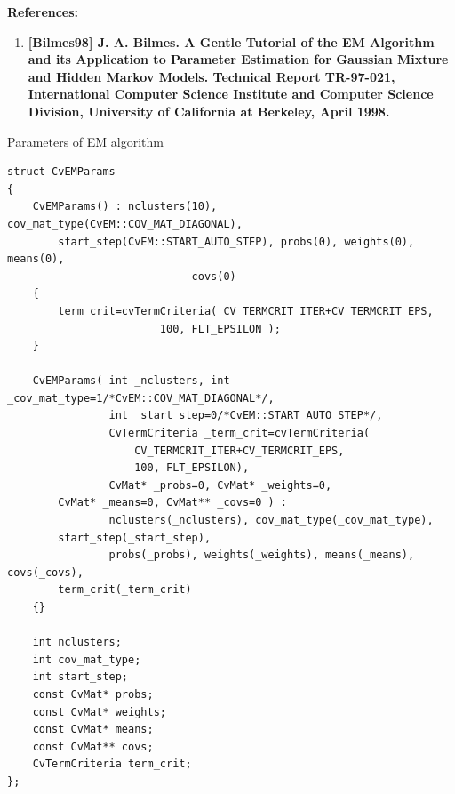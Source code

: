 \textbf{References:}
\begin{enumerate}
\item{\textbf{[Bilmes98] J. A. Bilmes. A Gentle Tutorial of the EM Algorithm and its Application to Parameter Estimation for Gaussian Mixture and Hidden Markov Models. Technical Report TR-97-021, International Computer Science Institute and Computer Science Division, University of California at Berkeley, April 1998.}}
\end{enumerate}



Parameters of EM algorithm

\begin{lstlisting}
struct CvEMParams
{
    CvEMParams() : nclusters(10), cov_mat_type(CvEM::COV_MAT_DIAGONAL),
        start_step(CvEM::START_AUTO_STEP), probs(0), weights(0), means(0), 
						     covs(0)
    {
        term_crit=cvTermCriteria( CV_TERMCRIT_ITER+CV_TERMCRIT_EPS, 
						100, FLT_EPSILON );
    }

    CvEMParams( int _nclusters, int _cov_mat_type=1/*CvEM::COV_MAT_DIAGONAL*/,
                int _start_step=0/*CvEM::START_AUTO_STEP*/,
                CvTermCriteria _term_crit=cvTermCriteria(
					CV_TERMCRIT_ITER+CV_TERMCRIT_EPS, 
					100, FLT_EPSILON),
                CvMat* _probs=0, CvMat* _weights=0, 
		CvMat* _means=0, CvMat** _covs=0 ) :
                nclusters(_nclusters), cov_mat_type(_cov_mat_type), 
		start_step(_start_step),
                probs(_probs), weights(_weights), means(_means), covs(_covs), 
		term_crit(_term_crit)
    {}

    int nclusters;
    int cov_mat_type;
    int start_step;
    const CvMat* probs;
    const CvMat* weights;
    const CvMat* means;
    const CvMat** covs;
    CvTermCriteria term_crit;
};
\end{lstlisting}

